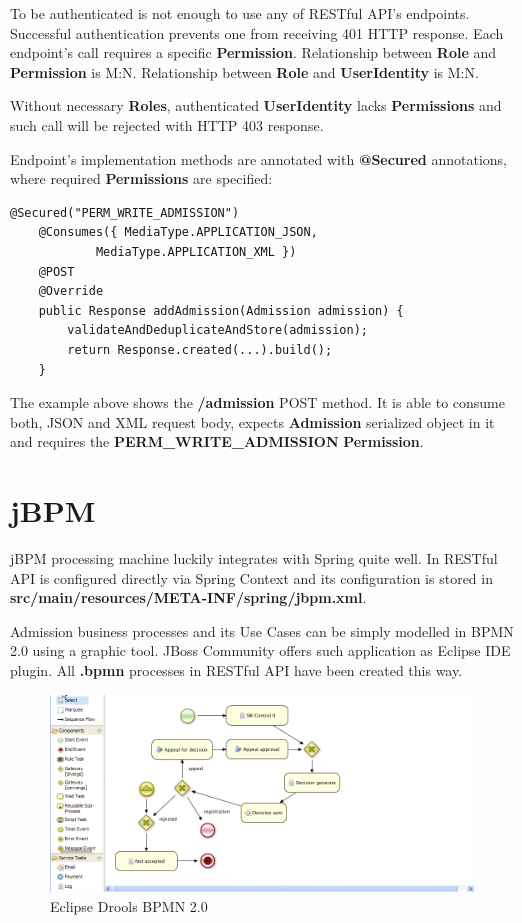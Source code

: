 	To be authenticated is not enough to use any of RESTful API's endpoints. Successful authentication prevents one from
	receiving 401 HTTP response. Each endpoint's call requires a specific \textbf{Permission}. Relationship between
	\textbf{Role} and \textbf{Permission} is M:N. Relationship between \textbf{Role} and \textbf{UserIdentity} is M:N.
	
	Without necessary \textbf{Roles}, authenticated \textbf{UserIdentity} lacks \textbf{Permissions} and such call
	will be rejected with HTTP 403 response.
	
	Endpoint's implementation methods are annotated with \textbf{@Secured} annotations, where required \textbf{Permissions}
	are specified:
	
	\lstset{language=Java}
	\begin{lstlisting}[tabsize=2]
	@Secured("PERM_WRITE_ADMISSION")
	@Consumes({ MediaType.APPLICATION_JSON,
			MediaType.APPLICATION_XML })
	@POST
	@Override
	public Response addAdmission(Admission admission) {
		validateAndDeduplicateAndStore(admission);
		return Response.created(...).build();
	}
	\end{lstlisting}
	
	The example above shows the \textbf{/admission} POST method. It is able to consume both, JSON and XML request body,
	expects \textbf{Admission} serialized object in it and requires the \textbf{PERM\_WRITE\_ADMISSION}
	\textbf{Permission}.
	
	\section{jBPM}
	
	jBPM processing machine luckily integrates with Spring quite well. In RESTful API is configured directly via Spring
	Context and its configuration is stored in \textbf{src/main/resources/META-INF/spring/jbpm.xml}.
	
	Admission business processes and its Use Cases can be simply modelled in BPMN 2.0 using a graphic tool. JBoss Community
	offers such application as Eclipse IDE plugin. All \textbf{.bpmn} processes in RESTful API have been created this way.
	
	\newpage
	\begin{figure}[h]
		\label{fig:eclipse_drools}
	  	\centering
	    \includegraphics[width=12cm]{figures/eclipse_drools}
	  	\caption{Eclipse Drools BPMN 2.0}
	\end{figure}
	
